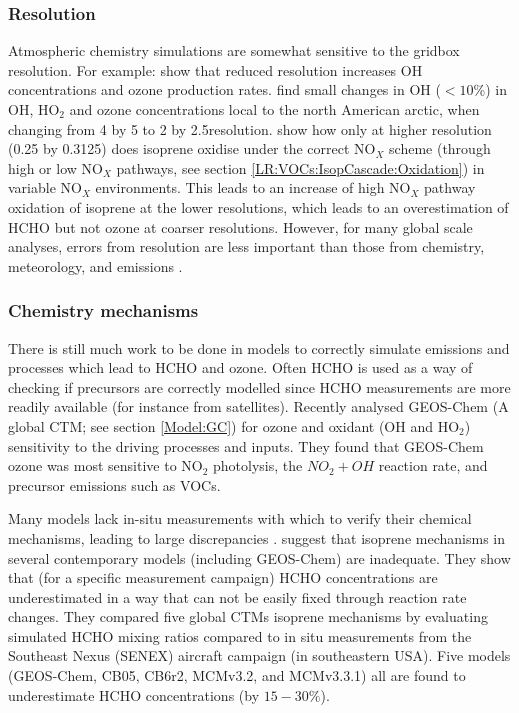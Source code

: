     \subsubsection{Resolution}
      \label{LR:Models:Uncert:Resolution}
      
      Atmospheric chemistry simulations are somewhat sensitive to the gridbox resolution.
      For example: \textcite{Wild2006} show that reduced resolution increases OH concentrations and ozone production rates.
      \textcite{Christian2017} find small changes in OH ($<10$\%) in OH, HO$_2$ and ozone concentrations local to the north American arctic, when changing from 4 by 5 to 2 by 2.5\degr resolution.
      \textcite{Yu2016} show how only at higher resolution (0.25 by 0.3125\degr) does isoprene oxidise under the correct NO$_X$ scheme (through high or low NO$_X$ pathways, see section \ref{LR:VOCs:IsopCascade:Oxidation}) in variable NO$_X$ environments.
      This leads to an increase of high NO$_X$ pathway oxidation of isoprene at the lower resolutions, which leads to an overestimation of HCHO but not ozone at coarser resolutions.
      However, for many global scale analyses, errors from resolution are less important than those from chemistry, meteorology, and emissions \parencite{Christian2017, Christian2018}.
      
            
    
    \subsubsection{Chemistry mechanisms}
      \label{LR:Models:Uncert:Chemistry}
      There is still much work to be done in models to correctly simulate emissions and processes which lead to HCHO and ozone.
      Often HCHO is used as a way of checking if precursors are correctly modelled since HCHO measurements are more readily available (for instance from satellites).
      Recently \textcite{Christian2017} analysed GEOS-Chem (A global CTM; see section \ref{Model:GC}) for ozone and oxidant (OH and HO$_2$) sensitivity to the driving processes and inputs.
      They found that GEOS-Chem ozone was most sensitive to NO$_2$ photolysis, the $NO_2 + OH$ reaction rate, and precursor emissions such as VOCs.

      Many models lack in-situ measurements with which to verify their chemical mechanisms, leading to large discrepancies \parencite{Marvin2017}.
      \textcite{Marvin2017} suggest that isoprene mechanisms in several contemporary models (including GEOS-Chem) are inadequate. 
      They show that (for a specific measurement campaign) HCHO concentrations are underestimated in a way that can not be easily fixed through reaction rate changes.
      They compared five global CTMs isoprene mechanisms by evaluating simulated HCHO mixing ratios compared to in situ measurements from the Southeast Nexus (SENEX) aircraft campaign (in southeastern USA).
      Five models (GEOS-Chem, CB05, CB6r2, MCMv3.2, and MCMv3.3.1) all are found to underestimate HCHO concentrations (by $15 - 30\%$).
      
